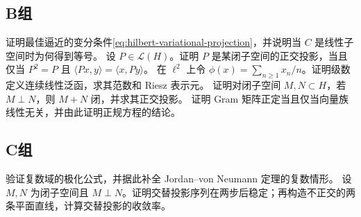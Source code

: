 \subsection*{B组}
\begin{enumerate}[label=\textbf{\thechapter.\arabic*.},resume]
证明最佳逼近的变分条件\eqref{eq:hilbert-variational-projection}，并说明当 \(C\) 是线性子空间时为何得到等号。
设 \(P\in\mathcal L(H)\)。证明 \(P\) 是某闭子空间的正交投影，当且仅当 \(P^2=P\) 且 \(\langle Px,y\rangle=\langle x,Py\rangle\)。
在 \(\ell^2\) 上令
\(\phi(x)=\sum_{n\ge1}x_n/n\)。证明级数定义连续线性泛函，求其范数和 Riesz 表示元。
证明对闭子空间 \(M,N\subset H\)，若 \(M\perp N\)，则 \(M+N\) 闭，并求其正交投影。
证明 Gram 矩阵正定当且仅当向量族线性无关，并由此证明正规方程的结论。
\end{enumerate}
\subsection*{C组}
\begin{enumerate}[label=\textbf{\thechapter.\arabic*.},resume]
验证复数域的极化公式，并据此补全 Jordan--von Neumann 定理的复数情形。
设 \(M,N\) 为闭子空间且 \(M\perp N\)。证明交替投影序列在两步后稳定；再构造不正交的两条平面直线，计算交替投影的收敛率。
\end{enumerate}
